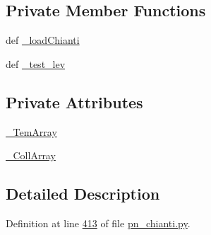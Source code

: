 \subsection*{Private Member Functions}
\begin{DoxyCompactItemize}
\item 
def \hyperlink{classpyneb_1_1utils_1_1pn__chianti_1_1___coll_chianti_af803ad8a0b88240bc865a6178307be82}{\-\_\-load\-Chianti}
\item 
def \hyperlink{classpyneb_1_1utils_1_1pn__chianti_1_1___coll_chianti_a691f0c72a7b1477a527de09fd4f6f235}{\-\_\-test\-\_\-lev}
\end{DoxyCompactItemize}
\subsection*{Private Attributes}
\begin{DoxyCompactItemize}
\item 
\hyperlink{classpyneb_1_1utils_1_1pn__chianti_1_1___coll_chianti_a7dc1ede29c8b436a27a20203cdb87f49}{\-\_\-\-Tem\-Array}
\item 
\hyperlink{classpyneb_1_1utils_1_1pn__chianti_1_1___coll_chianti_a5cdf912f3bcbf25bcbbba1ba8fc072d9}{\-\_\-\-Coll\-Array}
\end{DoxyCompactItemize}


\subsection{Detailed Description}


Definition at line \hyperlink{pn__chianti_8py_source_l00413}{413} of file \hyperlink{pn__chianti_8py_source}{pn\-\_\-chianti.\-py}.



